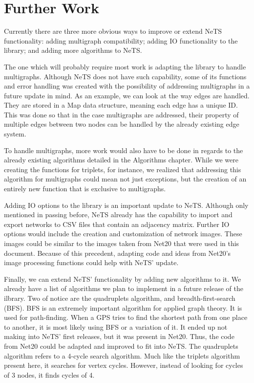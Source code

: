 \chapter{Further Work}

Currently there are three
more obvious ways to improve or extend NeTS functionality:
adding multigraph compatibility; adding IO functionality
to the library; and adding more algorithms to NeTS.

The one which will probably require most work is adapting
the library to handle multigraphs.
Although NeTS does not have such capability,
some of its functions and error handling was created with the possibility
of addressing multigraphs in a future update in mind.
As an example, we can look at the way edges are handled.
They are stored in a Map data structure, meaning each edge has a unique ID.
This was done so that in the case multigraphs are addressed,
their property of multiple edges between two nodes can be
handled by the already existing edge system.

To handle multigraphs, more work would also have to be done
in regards to the already existing algorithms detailed in the
Algorithms chapter.
While we were creating the functions for triplets, for instance,
we realized that addressing this algorithm for multigraphs
could mean not just exceptions, but the creation of an entirely new function
that is exclusive to multigraphs.

Adding IO options to the library is an important update to NeTS.
Although only mentioned in passing before, NeTS already has
the capability to import and export networks to CSV files that
contain an adjacency matrix.
Further IO options would include the creation and customization of
network images. These images could be similar to
the images taken from Net20 that were
used in this document. Because of this precedent,
adapting code and ideas from Net20's image processing
functions could help with NeTS' update.

Finally, we can extend NeTS' functionality by adding new algorithms to it.
We already have a list of algorithms we plan to implement in a
future release of the ilbrary. Two of notice are the quadruplets algorithm,
and breadth-first-search (BFS).
BFS is an extremely important algorithm for applied graph theory.
It is used for path-finding. When a GPS tries to find the shortest path
from one place to another, it is most likely using BFS or a variation of it.
It ended up not making into NeTS' first releases, but it was present
in Net20. Thus, the code from Net20 could be adapted and improved to fit
into NeTS.
The quadruplets algorithm refers to a 4-cycle search algorithm. Much like
the triplets algorithm present here, it searches for vertex cycles. However,
instead of looking for cycles of 3 nodes, it finds cycles of 4.